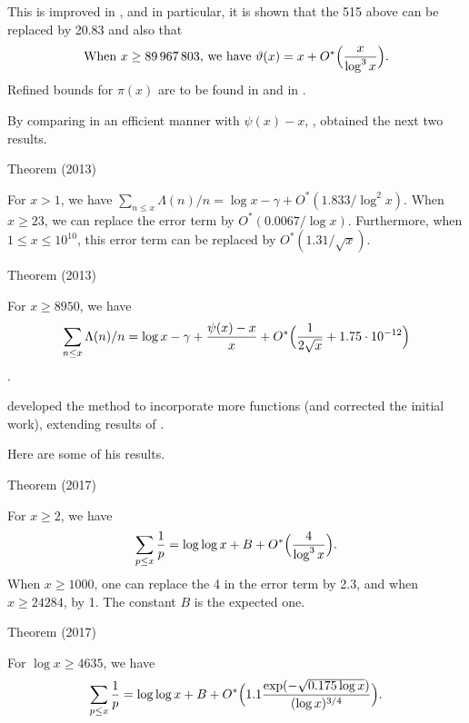 This is improved in
\cite{Dusart*16},
and in particular, it is shown that the 515 above can be replaced by
20.83 and also that
$$
\text{When $x\ge 89\,967\,803$, we have } \vartheta(x)=x+O^*\Bigl(\frac{x}{\log^3
x}\Bigr).
$$
Refined bounds for $\pi(x)$ are to be found in
\cite{Panaitopol*00}
and in
\cite{Axler*16}.



By comparing in an efficient manner with $\psi(x)-x$,
\cite{Ramare*12-1},
obtained the next two results.


\begin{thm}{Theorem (2013)}

  For $x > 1$, we have
  $\sum_{n\le x}\Lambda(n)/n=\log x-\gamma+O^*(1.833/\log^2x)$.
  When $x\ge 23$, we can replace the error term by $O^*(0.0067/\log
  x)$.
  Furthermore, when $1\le x\le 10^{10}$, this error term can be
  replaced by $O^*(1.31/\sqrt{x})$. 
\end{thm}



\begin{thm}{Theorem (2013)}

  For $x\ge 8950$, we have
  $$
  \sum_{n\le x}\Lambda(n)/n=\log x-\gamma
  +\frac{\psi(x)-x}{x}+O^*\Bigl(\frac{1}{2\sqrt{x}}+1.75\cdot 10^{-12}\Bigl)
  $$.
\end{thm}



\cite{Vanlalnagaia*15-1}
developed the method to incorporate more functions (and corrected the
initial work), extending results of
\cite{Rosser-Schoenfeld*62}.

Here are some of his results.


\begin{thm}{Theorem (2017)}

  For $x\ge 2$, we have
  $$
  \sum_{p\le x}\frac1p=\log\log  x+B+O^*\Bigl(\frac{4}{\log^3x}\Bigr).
  $$
  When $x\ge 1000$, one can replace the 4 in the error term by 2.3,
  and when $x\ge24284$, by 1. The constant $B$ is the expected one.
\end{thm}




\begin{thm}{Theorem (2017)}

  For $\log x\ge 4635$, we have
  $$
  \sum_{p\le x}\frac1p=\log\log
  x+B+O^*\Bigl(1.1\frac{\exp(-\sqrt{0.175\log x})}{(\log x)^{3/4}}\Bigr).
  $$
\end{thm}







